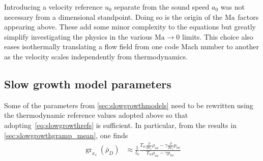 \documentclass[letterpaper,11pt,nointlimits,reqno,draft]{amsbook}
\newcommand{\Mach}[1][]{\ensuremath{\mbox{Ma}_{#1}}}
\begin{document}
Introducing a velocity reference $u_{0}$ separate from the sound speed $a_{0}$
was not necessary from a dimensional standpoint.  Doing so is the origin of the
$\Mach$ factors appearing above.  These add some minor complexity to the
equations but greatly simplify investigating the physics in the various
$\Mach\to{}0$ limits.  This choice also eases isothermally translating a flow
field from one code Mach number to another as the velocity scales independently
from thermodynamics.

\subsection{Slow growth model parameters}

Some of the parameters from \autoref{sec:slowgrowthmodels} need to be rewritten
using the thermodynamic reference values adopted above so that
adopting~\eqref{eq:slowgrowthrefs} is sufficient.  In particular, from the
results in \autoref{sec:slowgrowthgramp_mean}, one finds
\begin{align}
    \operatorname{gr}_{x_s}\!\left(\bar{\rho}_{D}\right)
    &\approx
    \frac{1}{l_0}
    \frac{
          T_w        \frac{\partial}{\partial x_s} \rho_{iw}
        -     \gamma \frac{\partial}{\partial x_s}    p_{iw}
    }{
          T_w \rho_{iw} - \gamma p_{iw}
    }
\end{align}
%
%
\end{document}
